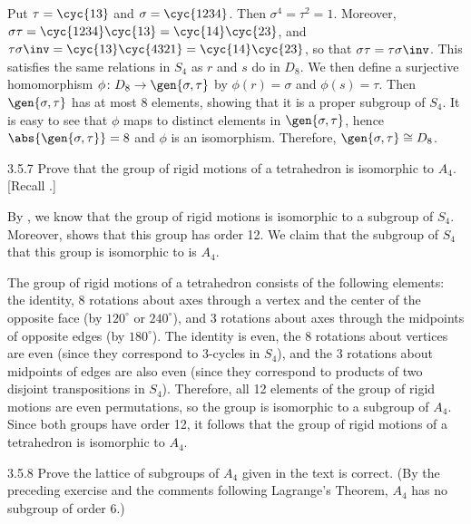 \begin{sol}
    Put $\tau = \cyc{1 3}$ and $\sigma = \cyc{1 2 3 4}$.
	Then $\sigma^4 = \tau^2 = 1$.
	Moreover, $\sigma\tau = \cyc{1 2 3 4}\cyc{1 3} = \cyc{1 4}\cyc{2 3}$, and $\tau\sigma\inv = \cyc{1 3}\cyc{4 3 2 1} = \cyc{1 4}\cyc{2 3}$, so that $\sigma\tau = \tau\sigma\inv$.
	This satisfies the same relations in $S_4$ as $r$ and $s$ do in $D_8$.
	We then define a surjective homomorphism $\phi \colon D_8 \to \gen{\sigma, \tau}$ by $\phi(r) = \sigma$ and $\phi(s) = \tau$.
	Then $\gen{\sigma, \tau}$ has at most 8 elements, showing that it is a proper subgroup of $S_4$.
	It is easy to see that $\phi$ maps to distinct elements in $\gen{\sigma, \tau}$, hence $\abs{\gen{\sigma, \tau}} = 8$ and $\phi$ is an isomorphism.
	Therefore, $\gen{\sigma, \tau} \cong D_8$.
\end{sol}

\begin{exercise}{3.5.7}
    Prove that the group of rigid motions of a tetrahedron is isomorphic to $A_4$. [Recall .]
\end{exercise}

\begin{sol}
    By , we know that the group of rigid motions is isomorphic to a subgroup of $S_4$.
	Moreover,  shows that this group has order 12.
	We claim that the subgroup of $S_4$ that this group is isomorphic to is $A_4$. 

    The group of rigid motions of a tetrahedron consists of the following elements: the identity, 8 rotations about axes through a vertex and the center of the opposite face (by $120^\circ$ or $240^\circ$), and 3 rotations about axes through the midpoints of opposite edges (by $180^\circ$).
	The identity is even, the 8 rotations about vertices are even (since they correspond to $3$-cycles in $S_4$), and the 3 rotations about midpoints of edges are also even (since they correspond to products of two disjoint transpositions in $S_4$).
	Therefore, all 12 elements of the group of rigid motions are even permutations, so the group is isomorphic to a subgroup of $A_4$.
	Since both groups have order 12, it follows that the group of rigid motions of a tetrahedron is isomorphic to $A_4$.
\end{sol}

\begin{exercise}{3.5.8}
    Prove the lattice of subgroups of $A_4$ given in the text is correct. (By the preceding exercise and the comments following Lagrange's Theorem, $A_4$ has no subgroup of order $6$.)
\end{exercise}


